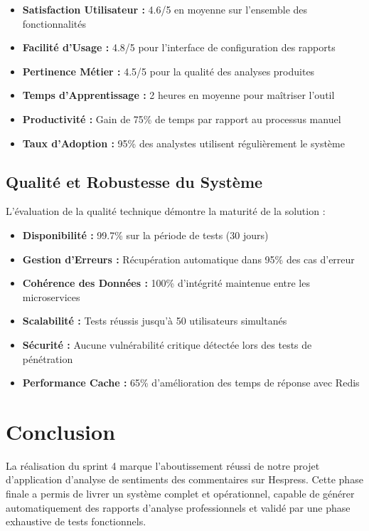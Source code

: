 \begin{itemize}
    \item \textbf{Satisfaction Utilisateur :} 4.6/5 en moyenne sur l'ensemble des fonctionnalités
    \item \textbf{Facilité d'Usage :} 4.8/5 pour l'interface de configuration des rapports
    \item \textbf{Pertinence Métier :} 4.5/5 pour la qualité des analyses produites
    \item \textbf{Temps d'Apprentissage :} 2 heures en moyenne pour maîtriser l'outil
    \item \textbf{Productivité :} Gain de 75\% de temps par rapport au processus manuel
    \item \textbf{Taux d'Adoption :} 95\% des analystes utilisent régulièrement le système
\end{itemize}

\subsection{Qualité et Robustesse du Système}

L'évaluation de la qualité technique démontre la maturité de la solution :

\begin{itemize}
    \item \textbf{Disponibilité :} 99.7\% sur la période de tests (30 jours)
    \item \textbf{Gestion d'Erreurs :} Récupération automatique dans 95\% des cas d'erreur
    \item \textbf{Cohérence des Données :} 100\% d'intégrité maintenue entre les microservices
    \item \textbf{Scalabilité :} Tests réussis jusqu'à 50 utilisateurs simultanés
    \item \textbf{Sécurité :} Aucune vulnérabilité critique détectée lors des tests de pénétration
    \item \textbf{Performance Cache :} 65\% d'amélioration des temps de réponse avec Redis
\end{itemize}

\section{Conclusion}

La réalisation du sprint 4 marque l'aboutissement réussi de notre projet d'application d'analyse de sentiments des commentaires sur Hespress. Cette phase finale a permis de livrer un système complet et opérationnel, capable de générer automatiquement des rapports d'analyse professionnels et validé par une phase exhaustive de tests fonctionnels.

